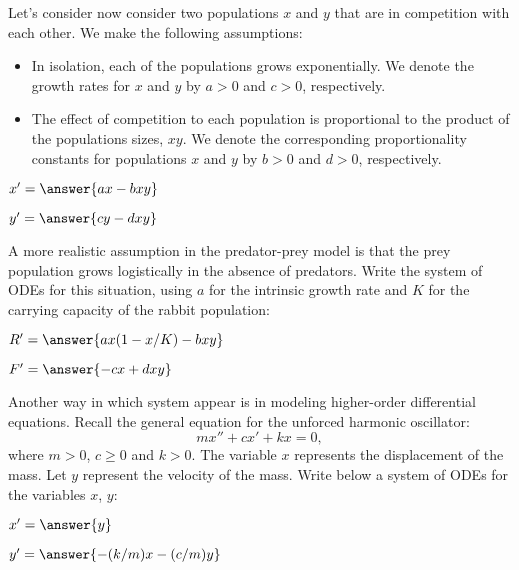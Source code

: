 \documentclass{ximera}
\begin{document}
\begin{problem}

Let's consider now consider two populations $x$ and $y$ that are in competition with each other. We make the following assumptions:
\begin{itemize}
\item In isolation, each of the populations grows exponentially. We denote the growth rates for $x$ and $y$ by $a>0$ and $c>0$, respectively. 
\item The effect of competition to each population is proportional to the product of the populations sizes, $xy$. We denote the corresponding proportionality constants for populations $x$ and $y$ by $b>0$ and $d>0$, respectively.
\end{itemize}

\begin{question}
$x'= \answer{ax-bxy}$
\end{question}
\begin{question}
$y'= \answer{cy-dxy}$
\end{question}
\end{problem}

\begin{problem}
A more realistic assumption in the predator-prey model is that the prey population grows logistically in the absence of predators. Write the system of ODEs for this situation, using $a$ for the intrinsic growth rate and $K$ for the carrying capacity of the rabbit population:
\begin{question}

$R'= \answer{ax(1-x/K)-bxy}$
\end{question}
\begin{question}

$F'= \answer{-cx+dxy}$
\end{question}
\end{problem}

\begin{problem} Another way in which system appear is in modeling higher-order differential equations. Recall the general equation for the unforced harmonic oscillator:
\[
mx''+cx'+kx=0,
\]
where $m>0$, $c\ge 0$ and $k>0$. The variable $x$ represents the displacement of the mass. Let $y$ represent the velocity of the mass. Write below a system of ODEs for the variables $x$, $y$:

\begin{question}
$x'= \answer{y}$
\end{question}

\begin{question}
$y'= \answer{-(k/m)x-(c/m)y}$
\end{question}

\end{problem}
\end{document}
